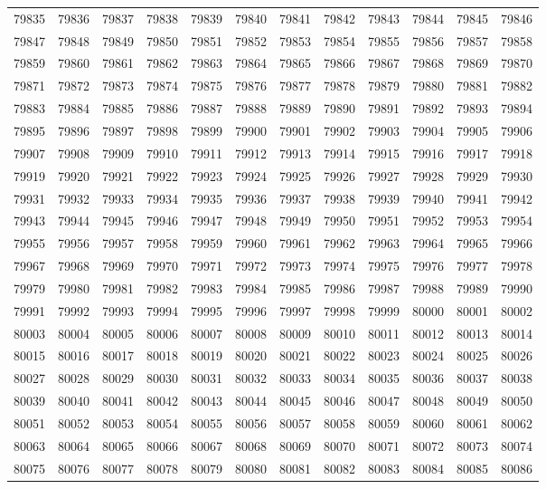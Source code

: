 \begin{center}
\begin{longtable}{llllllllllll}
79835 &79836 &79837 &79838 &79839 &79840 &79841 &79842 &79843 &79844 &79845 &79846 \\
79847 &79848 &79849 &79850 &79851 &79852 &79853 &79854 &79855 &79856 &79857 &79858 \\
79859 &79860 &79861 &79862 &79863 &79864 &79865 &79866 &79867 &79868 &79869 &79870 \\
79871 &79872 &79873 &79874 &79875 &79876 &79877 &79878 &79879 &79880 &79881 &79882 \\
79883 &79884 &79885 &79886 &79887 &79888 &79889 &79890 &79891 &79892 &79893 &79894 \\
79895 &79896 &79897 &79898 &79899 &79900 &79901 &79902 &79903 &79904 &79905 &79906 \\
79907 &79908 &79909 &79910 &79911 &79912 &79913 &79914 &79915 &79916 &79917 &79918 \\
79919 &79920 &79921 &79922 &79923 &79924 &79925 &79926 &79927 &79928 &79929 &79930 \\
79931 &79932 &79933 &79934 &79935 &79936 &79937 &79938 &79939 &79940 &79941 &79942 \\
79943 &79944 &79945 &79946 &79947 &79948 &79949 &79950 &79951 &79952 &79953 &79954 \\
79955 &79956 &79957 &79958 &79959 &79960 &79961 &79962 &79963 &79964 &79965 &79966 \\
79967 &79968 &79969 &79970 &79971 &79972 &79973 &79974 &79975 &79976 &79977 &79978 \\
79979 &79980 &79981 &79982 &79983 &79984 &79985 &79986 &79987 &79988 &79989 &79990 \\
79991 &79992 &79993 &79994 &79995 &79996 &79997 &79998 &79999 &80000 &80001 &80002 \\
80003 &80004 &80005 &80006 &80007 &80008 &80009 &80010 &80011 &80012 &80013 &80014 \\
80015 &80016 &80017 &80018 &80019 &80020 &80021 &80022 &80023 &80024 &80025 &80026 \\
80027 &80028 &80029 &80030 &80031 &80032 &80033 &80034 &80035 &80036 &80037 &80038 \\
80039 &80040 &80041 &80042 &80043 &80044 &80045 &80046 &80047 &80048 &80049 &80050 \\
80051 &80052 &80053 &80054 &80055 &80056 &80057 &80058 &80059 &80060 &80061 &80062 \\
80063 &80064 &80065 &80066 &80067 &80068 &80069 &80070 &80071 &80072 &80073 &80074 \\
80075 &80076 &80077 &80078 &80079 &80080 &80081 &80082 &80083 &80084 &80085 &80086 \\

\end{longtable}
\end{center}
